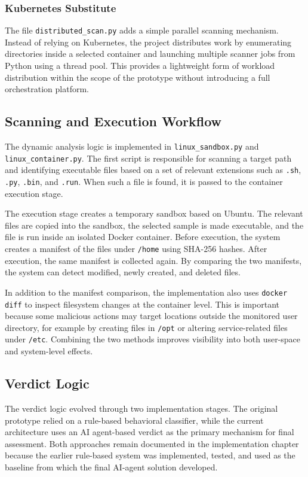  
 
 
\subsubsection{Kubernetes Substitute}
\noindent
The file \texttt{distributed\_scan.py} adds a simple parallel scanning mechanism. Instead of relying on Kubernetes, the project distributes work by enumerating directories inside a selected container and launching multiple scanner jobs from Python using a thread pool. This provides a lightweight form of workload distribution within the scope of the prototype without introducing a full orchestration platform.
 
\subsection{Scanning and Execution Workflow}
\noindent
The dynamic analysis logic is implemented in \texttt{linux\_sandbox.py} and \texttt{linux\_container.py}. The first script is responsible for scanning a target path and identifying executable files based on a set of relevant extensions such as \texttt{.sh}, \texttt{.py}, \texttt{.bin}, and \texttt{.run}. When such a file is found, it is passed to the container execution stage.
 
\vspace{1em}
 
The execution stage creates a temporary sandbox based on Ubuntu. The relevant files are copied into the sandbox, the selected sample is made executable, and the file is run inside an isolated Docker container. Before execution, the system creates a manifest of the files under \texttt{/home} using SHA-256 hashes. After execution, the same manifest is collected again. By comparing the two manifests, the system can detect modified, newly created, and deleted files.
 
\vspace{1em}
 
In addition to the manifest comparison, the implementation also uses \texttt{docker diff} to inspect filesystem changes at the container level. This is important because some malicious actions may target locations outside the monitored user directory, for example by creating files in \texttt{/opt} or altering service-related files under \texttt{/etc}. Combining the two methods improves visibility into both user-space and system-level effects.
 
\subsection{Verdict Logic}
\noindent
The verdict logic evolved through two implementation stages. The original prototype relied on a rule-based behavioral classifier, while the current architecture uses an AI agent-based verdict as the primary mechanism for final assessment. Both approaches remain documented in the implementation chapter because the earlier rule-based system was implemented, tested, and used as the baseline from which the final AI-agent solution developed.
 

